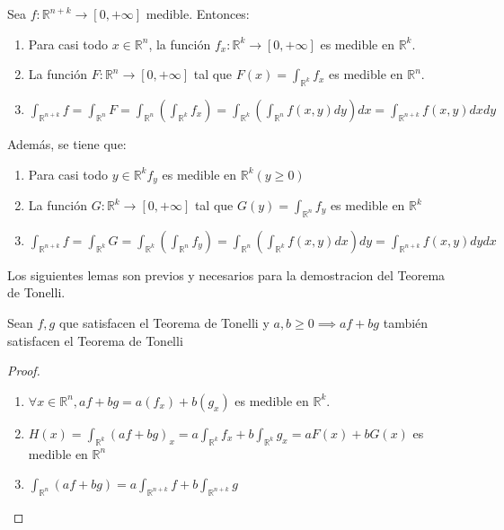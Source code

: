 \begin{teorema}
    Sea $f : \mathbb{R}^{n+k} \to [0, +\infty]$ medible. Entonces:
    \begin{enumerate}
        \item Para casi todo $x \in \mathbb{R}^n$, la función $f_{x} : \mathbb{R}^k \to [0,
                      +\infty]$ es medible en $\mathbb{R}^k$.
        \item La función $F: \mathbb{R}^n \to [0, +\infty]$ tal que $F(x) =
                  \int_{\mathbb{R}^k}f_x$ es medible en $\mathbb{R}^n$.
        \item $\int_{\mathbb{R}^{n+k}}f = \int_{\mathbb{R}^n}F = \int_{\mathbb{R}^n}(\int_{\mathbb{R}^k}f_x) = \int_{\mathbb{R}^k}(\int_{\mathbb{R}^n}f(x,y)dy)dx = \int_{\mathbb{R}^{n+k}}f(x,y)dxdy$
    \end{enumerate}
    Además, se tiene que:
    \begin{enumerate}
        \item Para casi todo $y \in \mathbb{R}^k f_y$ es medible en $\mathbb{R}^k (y \geq 0)$
        \item La función $G: \mathbb{R}^k \to [0, +\infty]$ tal que $G(y) =
                  \int_{\mathbb{R}^n}f_y$ es medible en $\mathbb{R}^k$
        \item $\int_{\mathbb{R}^{n+k}}f = \int_{\mathbb{R}^k}G = \int_{\mathbb{R}^k}(\int_{\mathbb{R}^n}f_y) = \int_{\mathbb{R}^n}(\int_{\mathbb{R}^k}f(x,y)dx)dy = \int_{\mathbb{R}^{n+k}}f(x,y)dydx$
    \end{enumerate}
\end{teorema}
\begin{observación}
    Los siguientes lemas son previos y necesarios para la demostracion del Teorema de Tonelli.
\end{observación}
\begin{lema}
    Sean $f,g$ que satisfacen el Teorema de Tonelli y $a, b \geq 0 \implies af + bg$ también satisfacen el Teorema de Tonelli
\end{lema}
\begin{proof}
    \begin{enumerate}
        \item $\forall x \in \mathbb{R}^n, af +bg = a(f_x) + b(g_x)$ es medible en $\mathbb{R}^k$.
        \item $H(x) = \int_{\mathbb{R}^k}(af + bg)_x = a\int_{\mathbb{R}^k}f_x + b\int_{\mathbb{R}^k}g_x = aF(x) + bG(x)$ es medible en $\mathbb{R}^n$
        \item $\int_{\mathbb{R}^{n}}(af +bg) = a\int_{\mathbb{R}^{n+k}}f + b \int_{\mathbb{R}^{n+k}}g$

    \end{enumerate}
\end{proof}

